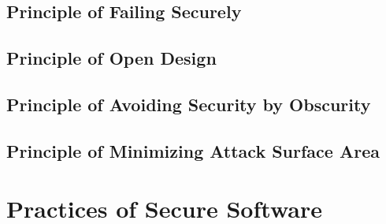 \subsection{Principle of Failing Securely}
\subsection{Principle of Open Design}
\subsection{Principle of Avoiding Security by Obscurity}
\subsection{Principle of Minimizing Attack Surface Area}


\section{Practices of Secure Software}





